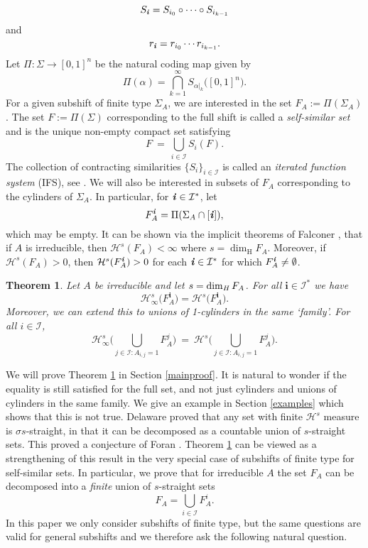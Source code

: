 \documentclass[11pt,english,british]{article}
\numberwithin{equation}{section}
\newtheorem{thm}{Theorem}[section]
\renewcommand{\H}{\text{H}}
\begin{document}
\[
S_{\textbf{\emph{i}}} = S_{i_0} \circ \cdots  \circ S_{i_{k-1}}
\]
and
\[
r_{\textbf{\emph{i}}} = r_{i_0} \cdots r_{i_{k-1}}.
\]
Let $\Pi: \Sigma \to [0,1]^n$ be the natural coding map given by
\[
\Pi(\alpha) = \bigcap_{k=1}^\infty S_{\alpha\vert_k} \big([0,1]^n\big).
\]
For a given subshift of finite type $\Sigma_A$, we are interested in the set $F_A:=\Pi(\Sigma_A)$.  The set $F:=\Pi(\Sigma)$ corresponding to the full shift is called a \emph{self-similar set} and is the unique non-empty compact set satisfying
\[
F \ = \ \bigcup_{i \in \mathcal{I}} S_i (F).
\]
The collection of contracting similarities $\{S_i\}_{i \in \mathcal{I}}$ is called an \emph{iterated function system} (IFS), see \cite[Chapter 9]{falconer}.  We will also be interested in subsets of $F_A$ corresponding to the cylinders of $\Sigma_A$.  In particular, for $\textbf{\emph{i}} \in \mathcal{I}^*$, let
\[
F_A^\textbf{\emph{i}} = \Pi(\Sigma_A \cap [\textbf{\emph{i}}]),
\]
which may be empty.  It can be shown via the implicit theorems of Falconer \cite{implicit}, \cite[Section 3.1]{techniques} that if $A$ is irreducible, then  $\mathcal{H}^s(F_A) < \infty$ where $s = \dim_\H F_A$.  Moreover, if $\mathcal{H}^s(F_A) > 0$, then $\mathcal{H}^s(F_A^\textbf{\emph{i}}) > 0$ for each $\textbf{\emph{i}} \in \mathcal{I}^*$ for which $F_A^\textbf{\emph{i}} \neq \emptyset$.


\begin{thm} \label{main}
Let $A$ be irreducible and let $s = \dim_\text{\emph{H}} F_A$.  For all $\textbf{i} \in \mathcal{I}^*$ we have
\[
\mathcal{H}_\infty^s \big(F_A^\textbf{i}\big) =  \mathcal{H}^s \big(F_A^\textbf{i}\big).
\]
Moreover, we can extend this to unions of 1-cylinders in the same `family'.  For all $i \in \mathcal{I}$,
\[
\mathcal{H}_\infty^s  \Bigg( \bigcup_{j \in \mathcal{I} : A_{i,j} = 1}  F_A^j \Bigg) \  =  \  \mathcal{H}^s \Bigg( \bigcup_{j \in \mathcal{I} : A_{i,j} = 1}  F_A^j \Bigg).
\]
\end{thm}

We will prove Theorem \ref{main} in Section \ref{mainproof}.  It is natural to wonder if the equality is still satisfied for the full set, and not just cylinders and unions of cylinders in the same family.  We give an example in Section \ref{examples} which shows that this is not true.  Delaware \cite{delaware} proved that any set with finite $\mathcal{H}^s$ measure is $\sigma s$-straight, in that it can be decomposed as a countable union of $s$-straight sets.  This proved a conjecture of Foran \cite{foran}.  Theorem \ref{main} can be viewed as a strengthening of this result in the very special case of subshifts of finite type for self-similar sets.  In particular, we prove that for irreducible $A$ the set $F_A$ can be decomposed into a \emph{finite} union of $s$-straight sets
\[
F_A = \bigcup_{i \in \mathcal{I}} F_A^i.
\]
In this paper we only consider subshifts of finite type, but the same questions are valid for general subshifts and we therefore ask the following natural question.
\end{document}
